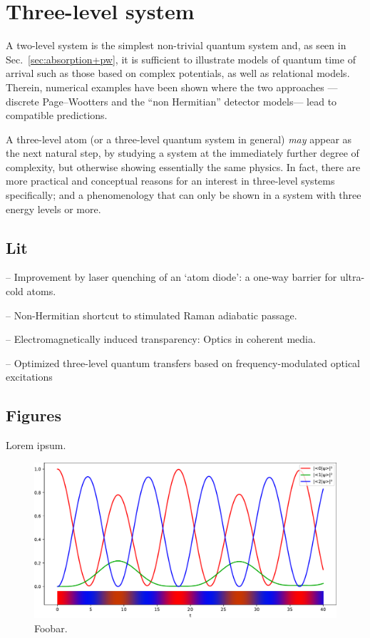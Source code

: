 \section{Three-level system}\label{sec:pw3l}

A two-level system is the simplest non-trivial quantum system and,
as seen in Sec.~\ref{sec:absorption+pw},
it is sufficient to illustrate
models of quantum time of arrival
such as those based on complex potentials,
as well as relational models.
Therein, numerical examples have been shown where the two approaches
---discrete Page--Wootters and the ``non Hermitian'' detector models---
lead to
compatible predictions.

A three-level atom (or a three-level quantum system in general) \emph{may} appear as
the next natural step, by studying a system at the immediately further
degree of complexity, but otherwise showing essentially
the same physics. In fact, there are more practical and conceptual reasons
for an interest in three-level systems specifically; and a phenomenology
that can only be shown in a system with three energy levels or more.

\subsection{Lit}
\cite{Ruschhaupt_AtomDiode} -- Improvement by laser quenching of an `atom diode': a one-way barrier for ultra-cold atoms.

\cite{NonHermitianShortcutSTIRAP} -- Non-Hermitian shortcut to stimulated Raman adiabatic passage.

\cite{EIT_Review} -- Electromagnetically induced transparency: Optics in coherent media.

\cite{OptimizedTransferSTIRAP} -- Optimized three-level quantum transfers based on frequency-modulated optical excitations


\subsection{Figures}

Lorem ipsum.

\begin{figure}
  \includegraphics[width=\textwidth]{img/3ldetect/hermitian3lines.pdf}
  \caption{Foobar.}
\end{figure}

